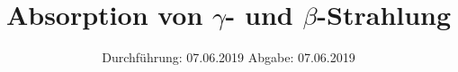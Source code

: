 

\subject{Nr. 704}
\title{Absorption von $\gamma$- und $\beta$-Strahlung}
\date{%
  Durchführung: 07.06.2019
  \hspace{3em}
  Abgabe: 07.06.2019
}



\maketitle
\thispagestyle{empty}
\tableofcontents
\newpage






\printbibliography{}


